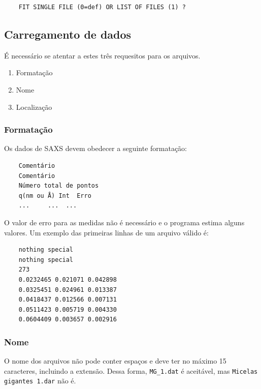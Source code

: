 \begin{apendicesenv}
\begin{samepage}
\begin{verbatim}
	FIT SINGLE FILE (0=def) OR LIST OF FILES (1) ?
	\end{verbatim}
\end{samepage}

\subsection{Carregamento de dados}

É necessário se atentar a estes três requesitos para os arquivos.

\begin{enumerate}
	\item Formatação
	\item Nome
	\item Localização
\end{enumerate}

\subsubsection{Formatação}

Os dados de SAXS devem obedecer a seguinte formatação:

\begin{linenumbers}
	\begin{verbatim}
	Comentário
	Comentário
	Número total de pontos
	q(nm ou Å) Int  Erro
	...     ...  ...
	\end{verbatim}
\end{linenumbers}
\resetlinenumber[1]

O valor de erro para as medidas não é necessário e o programa estima alguns valores. Um exemplo das primeiras linhas de um arquivo válido é:

\begin{linenumbers}
	\begin{verbatim}
	nothing special
	nothing special
	273
	0.0232465 0.021071 0.042898
	0.0325451 0.024961 0.013387
	0.0418437 0.012566 0.007131
	0.0511423 0.005719 0.004330
	0.0604409 0.003657 0.002916
	\end{verbatim}
\end{linenumbers}
\resetlinenumber[1]

\subsubsection{Nome}

O nome dos arquivos não pode conter espaços e deve ter no máximo 15 caracteres, incluindo a extensão. Dessa forma, \texttt{MG\_1.dat} é aceitável, mas \texttt{Micelas gigantes 1.dar} não é.


\end{apendicesenv}

